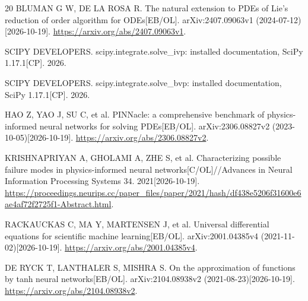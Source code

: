 \documentclass[11pt]{article}
\theoremstyle{definition}
\begin{document}
\begin{thebibliography}{20}
BLUMAN G W, DE LA ROSA R. The natural extension to PDEs of Lie's reduction
of order algorithm for ODEs[EB/OL].
arXiv:2407.09063v1 (2024-07-12)[2026-10-19].
\url{https://arxiv.org/abs/2407.09063v1}.

SCIPY DEVELOPERS. scipy.integrate.solve\_ivp: installed documentation,
SciPy 1.17.1[CP]. 2026.

SCIPY DEVELOPERS. scipy.integrate.solve\_bvp: installed documentation,
SciPy 1.17.1[CP]. 2026.

HAO Z, YAO J, SU C, et al. PINNacle: a comprehensive benchmark of
physics-informed neural networks for solving PDEs[EB/OL].
arXiv:2306.08827v2 (2023-10-05)[2026-10-19].
\url{https://arxiv.org/abs/2306.08827v2}.

KRISHNAPRIYAN A, GHOLAMI A, ZHE S, et al. Characterizing possible failure
modes in physics-informed neural networks[C/OL]//Advances in Neural
Information Processing Systems 34. 2021[2026-10-19].
\url{https://proceedings.neurips.cc/paper_files/paper/2021/hash/df438e5206f31600e6ae4af72f2725f1-Abstract.html}.

RACKAUCKAS C, MA Y, MARTENSEN J, et al. Universal differential equations
for scientific machine learning[EB/OL].
arXiv:2001.04385v4 (2021-11-02)[2026-10-19].
\url{https://arxiv.org/abs/2001.04385v4}.

DE RYCK T, LANTHALER S, MISHRA S. On the approximation of functions by
tanh neural networks[EB/OL].
arXiv:2104.08938v2 (2021-08-23)[2026-10-19].
\url{https://arxiv.org/abs/2104.08938v2}.

\end{thebibliography}
\endgroup
\end{document}

